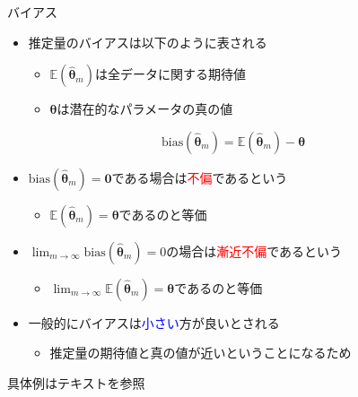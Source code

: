 \documentclass[dvipdfmx, 10pt]{beamer}
\begin{document}

\begin{frame}{バイアス}
  \begin{itemize}
    \item 推定量のバイアスは以下のように表される
    \begin{itemize}
      \item $\mathbb{E}(\hat{\bm{\theta}}_{m})$は全データに関する期待値
      \item $\bm{\theta}$は潜在的なパラメータの真の値
    \end{itemize}
  \end{itemize}
  \begin{equation}
    \mathrm{bias}(\hat{\bm{\theta}}_{m}) = \mathbb{E}(\hat{\bm{\theta}}_{m}) - \bm{\theta}
  \end{equation}
  \begin{itemize}
    \item $\mathrm{bias}(\hat{\bm{\theta}}_{m}) = \bm{0}$である場合は\textcolor{red}{不偏}であるという
    \begin{itemize}
      \item $\mathbb{E}(\hat{\bm{\theta}}_{m}) = \bm{\theta}$であるのと等価
    \end{itemize}
    \item $\lim_{m \to \infty} \mathrm{bias}(\hat{\bm{\theta}}_{m}) = 0$の場合は\textcolor{red}{漸近不偏}であるという
    \begin{itemize}
      \item $\lim_{m \to \infty} \mathbb{E}(\hat{\bm{\theta}}_{m}) = \bm{\theta}$であるのと等価
    \end{itemize}
    \item 一般的にバイアスは\textcolor{blue}{小さい}方が良いとされる
    \begin{itemize}
      \item 推定量の期待値と真の値が近いということになるため
    \end{itemize}
  \end{itemize}
  
  具体例はテキストを参照
\end{frame}

\end{document}
